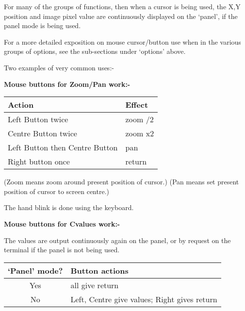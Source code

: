 \begin{small}
{{ For many of the groups of functions, then when a cursor is being
 used, the X,Y position and image pixel value are continuously
 displayed on the `panel', if the panel mode is being used.

 For a more detailed exposition on mouse cursor/button use when
 in the various groups of options, see the sub-sections under
 `options' above.

 Two examples of very common uses:-

{\bf \hspace*{4ex}      Mouse buttons for Zoom/Pan work:- }

\hspace*{4ex}\begin{tabular}{|l|l|}\hline
Action                         & Effect \\ \hline
Left Button twice              & zoom /2 \\
Centre Button twice            & zoom x2 \\
Left Button then Centre Button & pan \\
Right button once              & return \\ \hline
\end{tabular}

(Zoom means zoom around present position of cursor.) \newline
(Pan means set present position of cursor to screen centre.)


The hand blink is done using the keyboard.

{\bf \hspace*{4ex}      Mouse buttons for Cvalues work:- }

The values are output continuously again on the panel, or by
request on the terminal if the panel is not being used.

\hspace*{4ex}\begin{tabular}{|c|l|} \hline
      `Panel' mode?  &  Button actions \\ \hline
           Yes       &  all give return \\
           No        &  Left, Centre give values; Right gives return \\
\hline\end{tabular}


}}
\end{small}
